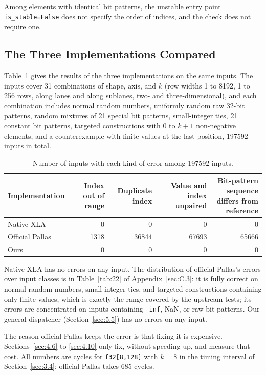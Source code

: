 \documentclass[sigconf,nonacm,balance=false]{acmart}
\newcommand{\code}[1]{\texttt{#1}}
\begin{document}
Among elements with identical bit patterns, the unstable entry point \code{is\_\allowbreak{}stable=\allowbreak{}False} does not specify the order of indices, and the check does not require one.

\subsection{The Three Implementations Compared}
\label{sec:4.5}

Table~\ref{tab:4} gives the results of the three implementations on the same inputs. The inputs cover 31 combinations of shape, axis, and $k$ (row widths 1 to 8192, 1 to 256 rows, along lanes and along sublanes, two- and three-dimensional), and each combination includes normal random numbers, uniformly random raw 32-bit patterns, random mixtures of 21 special bit patterns, small-integer ties, 21 constant bit patterns, targeted constructions with 0 to $k + 1$ non-negative elements, and a counterexample with finite values at the last position, 197592 inputs in total.

\begin{table}
\centering
\caption{Number of inputs with each kind of error among 197592 inputs.}
\label{tab:4}
\begin{tabular}{lrrrr}
\toprule
Implementation & Index out of range & Duplicate index & Value and index unpaired & \makecell[rb]{Bit-pattern sequence\\differs from reference} \\
\midrule
Native XLA & 0 & 0 & 0 & 0 \\
Official Pallas & 1318 & 36844 & 67693 & 65666 \\
Ours & 0 & 0 & 0 & 0 \\
\bottomrule
\end{tabular}
\end{table}

Native XLA has no errors on any input. The distribution of official Pallas's errors over input classes is in Table~\ref{tab:22} of Appendix~\ref{sec:C.3}: it is fully correct on normal random numbers, small-integer ties, and targeted constructions containing only finite values, which is exactly the range covered by the upstream tests; its errors are concentrated on inputs containing \code{-inf}, NaN, or raw bit patterns. Our general dispatcher (Section~\ref{sec:5.5}) has no errors on any input.

The reason official Pallas keeps the error is that fixing it is expensive. Sections~\ref{sec:4.6} to \ref{sec:4.10} only fix, without speeding up, and measure that cost. All numbers are cycles for \code{f32[8,\allowbreak{}128]} with $k = 8$ in the timing interval of Section~\ref{sec:3.4}; official Pallas takes 685 cycles.
\end{document}
